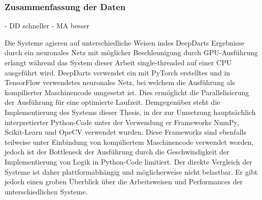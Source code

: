 
\subsubsection{Zusammenfassung der Daten} %

- DD schneller
- MA besser


Die Systeme agieren auf unterschiedliche Weisen indes DeepDarts Ergebnisse durch ein neuronales Netz mit möglicher Beschleunigung durch GPU-Ausführung erlangt während das System dieser Arbeit single-threaded auf einer CPU ausgeführt wird.
DeepDarts verwendet ein mit PyTorch erstelltes und in TensorFlow verwendetes neuronales Netz, bei welchem die Ausführung als kompilierter Maschinencode umgesetzt ist. Dies ermöglicht die Parallelisierung der Ausführung für eine optimierte Laufzeit.
Demgegenüber steht die Implementierung des Systems dieser Thesis, in der zur Umsetzung hauptsächlich interpretierter Python-Code unter der Verwendung er Frameworks NumPy, Scikit-Learn und OpeCV verwendet wurden. Diese Frameworks sind ebenfalls teilweise unter Einbindung von kompiliertem Maschinencode verwendet worden, jedoch ist der Bottleneck der Ausführung durch die Geschwindigkeit der Implementierung von Logik in Python-Code limitiert.
Der direkte Vergleich der Systeme ist daher plattformabhängig und möglicherweise nicht belastbar. Er gibt jedoch einen groben Überblick über die Arbeitsweisen und Performances der unterschiedlichen Systeme.
